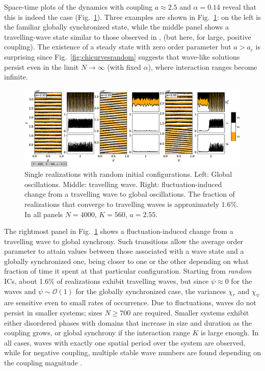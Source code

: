 Space-time plots of the dynamics with coupling $a\approx 2.5$ and $\alpha=0.14$ reveal that this is indeed the case
(Fig.~\ref{fig:trialpanel2}).  Three examples are shown in Fig.~\ref{fig:trialpanel2}: on the left is the familiar globally
synchronized state, while the middle panel shows a travelling-wave state similar to those observed in \cite{escaff2014arrays}, (but
here, for large, positive coupling). The existence of a steady state with zero order parameter but $a>a_c$ is surprising since
Fig.~\ref{fig:chicurvesrandom} suggests that wave-like solutions persist even in the limit $N\to\infty$ (with fixed $\alpha$), where
interaction ranges become infinite.

\begin{figure}
\begin{center}
    \includegraphics[width=1.\textwidth]{fig/chap2/articuno_figure_panel2.eps}
\caption{\label{fig:trialpanel2} Single realizations with random initial configurations. Left: Global oscillations. Middle: travelling
wave. Right: fluctuation-induced change from a travelling wave to global oscillations.  The fraction of realizations that converge to
travelling waves is approximately $1.6\%$. In all panels $N=4000$, $K=560$, $a=2.55$.}
\end{center}
\end{figure}

The rightmost panel in Fig.~\ref{fig:trialpanel2} shows a fluctuation-induced change from a travelling wave to global synchrony.  Such
transitions allow the average order parameter to attain values between those associated with a wave state and a globally synchronized
one, being closer to one or the other depending on what fraction of time it spent at that particular configuration.  Starting from
\textit{random} ICs, about 1.6\% of realizations exhibit travelling waves, but since $\psi\approx 0$ for the waves and $\psi \sim
\mathcal{O}(1)$ for the globally synchronized case, the variances $\chi_r$ and $\chi_{\psi}$ are sensitive even to small rates of
occurrence.  Due to fluctuations, waves do not persist in smaller systems; sizes $N \geq 700$ are required. Smaller systems exhibit
either disordered phases with domains that increase in size and duration as the coupling grows, or global synchrony if the interaction
range $K$ is large enough.  In all cases, waves with exactly one spatial period over the system are observed, while for negative
coupling, multiple stable wave numbers are found depending on the coupling magnitude \cite{escaff2014arrays}.

